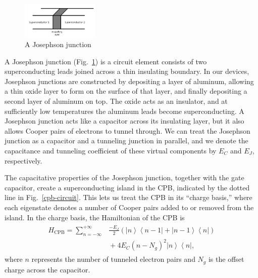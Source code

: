\documentclass[twocolumn]{revtex4}
\newcommand{\bra}[1]{\left< #1 \right|}
\newcommand{\ket}[1]{\left| #1 \right>}
\newcommand{\figwidth}{0.33\textwidth}
\begin{document}
\begin{figure}
  \includegraphics[width=\figwidth]{junction.png}
  \caption{ A Josephson junction }
  \label{junction}
\end{figure}

A Josephson junction (Fig.~\ref{junction}) is a circuit element
consists of two superconducting leads joined across a thin insulating
boundary. In our devices, Josephson junctions are constructed by
depositing a layer of aluminum, allowing a thin oxide layer to form on
the surface of that layer, and finally depositing a second layer of
aluminum on top. The oxide acts as an insulator, and at sufficiently
low temperatures the aluminum leads become superconducting. A
Josephson junction acts like a capacitor across its insulating layer,
but it also allows Cooper pairs of electrons to tunnel through. We can
treat the Josephson junction as a capacitor and a tunneling junction
in parallel, and we denote the capacitance and tunneling coefficient
of these virtual components by $E_C$ and $E_J$, respectively.

The capacitative properties of the Josephson junction, together with
the gate capacitor, create a superconducting island in the CPB,
indicated by the dotted line in Fig.~\ref{cpb-circuit}. This lets us
treat the CPB in its ``charge basis,'' where each eigenstate denotes a
number of Cooper pairs added to or removed from the island. In the
charge basis, the Hamiltonian of the CPB is
\begin{align}
\label{cpb-H}
\begin{split}
  H_{\text{CPB}} = \sum_{n=-\infty}^{+\infty}& \frac{-E_J}{2}\left(
      \ket{n}\bra{n-1} + \ket{n-1}\bra{n} \right) \\
    & {} + 4E_C(n-N_g)^2\ket{n}\bra{n},
\end{split}
\end{align}
where $n$ represents the number of tunneled electron pairs and $N_g$
is the offset charge across the capacitor.
\end{document}
